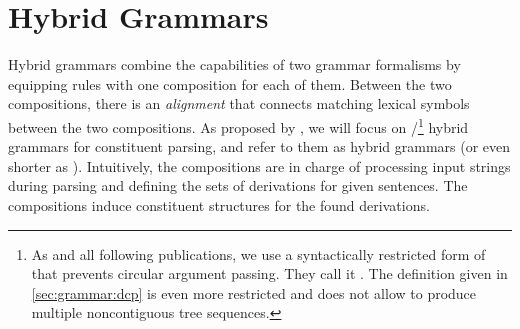 \documentclass[../../document.tex]{subfiles}
\begin{document}
    \section{Hybrid Grammars}\label{sec:grammar:hybrid}
    Hybrid grammars \citep{Ned14,Geb17,Geb20} combine the capabilities of two grammar formalisms by equipping rules with one composition for each of them.
    Between the two compositions, there is an \emph{alignment} that connects matching lexical symbols between the two compositions.
    As proposed by \citet{Ned14}, we will focus on /\footnote{
        As \citet{Ned14} and all following publications, we use a syntactically restricted form of  that prevents circular argument passing. They call it .
        The definition given in \cref{sec:grammar:dcp} is even more restricted and does not allow to produce multiple noncontiguous tree sequences.
    } hybrid grammars for constituent parsing, and refer to them as hybrid grammars (or even shorter as ).
    Intuitively, the  compositions are in charge of processing input strings during parsing and defining the sets of derivations for given sentences.
    The  compositions induce constituent structures for the found derivations.
\end{document}
